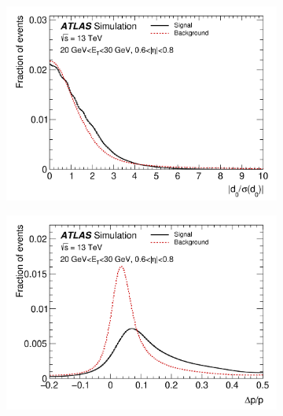 \begin{figure}[hp]
\centering
  \begin{subfigure}[b]{0.49\textwidth}
    \centering
    \includegraphics[width=1.0\textwidth]{figs/egamma/d0_sig.png} 
    \label{fig:egamma:d0_sig}
  \end{subfigure}
  \hfill
  \begin{subfigure}[b]{0.49\textwidth}
    \centering
    \includegraphics[width=1.0\textwidth]{figs/egamma/delatPoverp.png} 
    \label{fig:egamma:deltaPoverp}
  \end{subfigure}
  \hfill
  \begin{subfigure}[b]{0.49\textwidth}
    \centering

\end{subfigure}
\end{figure}
